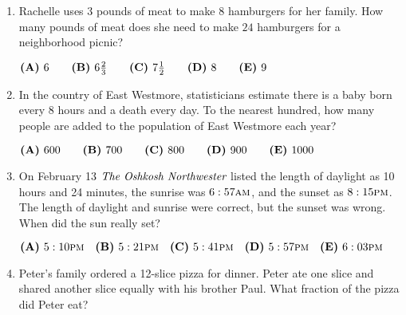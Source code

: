 \documentclass{article}
\begin{document}
\begin{enumerate}[label=\arabic*., itemsep=0.5em]\item Rachelle uses \( 3 \) pounds of meat to make \( 8 \) hamburgers for her family. How many pounds of meat does she need to make \( 24 \) hamburgers for a neighborhood picnic?

\( \textbf{(A)}\hspace{.05in}6\qquad\textbf{(B)}\hspace{.05in}6\frac{2}3\qquad\textbf{(C)}\hspace{.05in}7\frac{1}2\qquad\textbf{(D)}\hspace{.05in}8\qquad\textbf{(E)}\hspace{.05in}9 \)\par \vspace{0.5em}\item In the country of East Westmore, statisticians estimate there is a baby born every \( 8 \) hours and a death every day. To the nearest hundred, how many people are added to the population of East Westmore each year?

\( \textbf{(A)}\hspace{.05in}600\qquad\textbf{(B)}\hspace{.05in}700\qquad\textbf{(C)}\hspace{.05in}800\qquad\textbf{(D)}\hspace{.05in}900\qquad\textbf{(E)}\hspace{.05in}1000 \)\par \vspace{0.5em}\item On February 13 \(\emph{The Oshkosh Northwester}\) listed the length of daylight as 10 hours and 24 minutes, the sunrise was \( 6:57\textsc{am} \), and the sunset as \( 8:15\textsc{pm} \). The length of daylight and sunrise were correct, but the sunset was wrong. When did the sun really set?

\( \textbf{(A)}\hspace{.05in}5:10\textsc{pm}\quad\textbf{(B)}\hspace{.05in}5:21\textsc{pm}\quad\textbf{(C)}\hspace{.05in}5:41\textsc{pm}\quad\textbf{(D)}\hspace{.05in}5:57\textsc{pm}\quad\textbf{(E)}\hspace{.05in}6:03\textsc{pm} \)\par \vspace{0.5em}\item Peter's family ordered a 12-slice pizza for dinner. Peter ate one slice and shared another slice equally with his brother Paul. What fraction of the pizza did Peter eat?


\end{enumerate}
\end{document}

